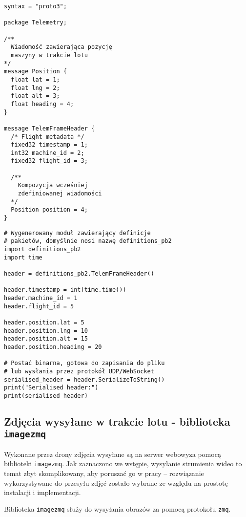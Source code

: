 \begin{lstlisting}[label=list:protobuf,caption=Przykład definicji pakietu \texttt{protobuf}, basicstyle=\footnotesize\ttfamily]
syntax = "proto3";

package Telemetry;

/**
  Wiadomość zawierająca pozycję
  maszyny w trakcie lotu
*/
message Position {
  float lat = 1;
  float lng = 2;
  float alt = 3;
  float heading = 4;
}

message TelemFrameHeader {
  /* Flight metadata */
  fixed32 timestamp = 1;
  int32 machine_id = 2;
  fixed32 flight_id = 3;

  /**
	Kompozycja wcześniej
	zdefiniowanej wiadomości 
  */
  Position position = 4;
}
\end{lstlisting}

\begin{lstlisting}[label=list:protobuf,caption=Przykład wykorzystania wygenerowanej implementacji pakietów w języku Python,basicstyle=\footnotesize\ttfamily]
# Wygenerowany moduł zawierający definicje
# pakietów, domyślnie nosi nazwę definitions_pb2
import definitions_pb2
import time

header = definitions_pb2.TelemFrameHeader()

header.timestamp = int(time.time())
header.machine_id = 1
header.flight_id = 5

header.position.lat = 5
header.position.lng = 10
header.position.alt = 15
header.position.heading = 20

# Postać binarna, gotowa do zapisania do pliku
# lub wysłania przez protokół UDP/WebSocket
serialised_header = header.SerializeToString()
print("Serialised header:")
print(serialised_header) 
\end{lstlisting}

\subsection{Zdjęcia wysyłane w trakcie lotu - biblioteka \texttt{imagezmq}}

Wykonane przez drony zdjęcia wysyłane są na serwer webowyza pomocą biblioteki
\texttt{imagezmq}. Jak zaznaczono we wstępie, wysyłanie strumienia wideo to
temat zbyt skomplikowany, aby poruszać go w pracy -- rozwiązanie wykorzystywane
do przesyłu zdjęć zostało wybrane ze względu na prostotę instalacji i implementacji.

Biblioteka \texttt{imagezmq} służy do wysyłania obrazów za pomocą protokołu \texttt{zmq}.

